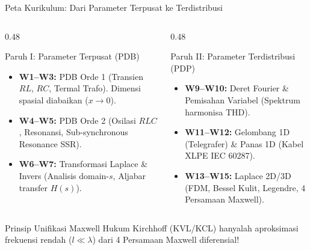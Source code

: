 \documentclass[aspectratio=169,10pt]{beamer}
\begin{document}
\begin{frame}{Peta Kurikulum: Dari Parameter Terpusat ke Terdistribusi}
  \begin{columns}[t]
    \begin{column}{0.48\textwidth}
      \begin{block}{Paruh I: Parameter Terpusat (PDB)}
        \small
        \begin{itemize}
          \item \textbf{W1--W3:} PDB Orde 1 (Transien $RL$, $RC$, Termal Trafo). Dimensi spasial diabaikan ($x \to 0$).
          \item \textbf{W4--W5:} PDB Orde 2 (Osilasi $RLC$, Resonansi, Sub-synchronous Resonance SSR).
          \item \textbf{W6--W7:} Transformasi Laplace \& Invers (Analisis domain-$s$, Aljabar transfer $H(s)$).
        \end{itemize}
      \end{block}
    \end{column}
    \begin{column}{0.48\textwidth}
      \begin{alertblock}{Paruh II: Parameter Terdistribusi (PDP)}
        \small
        \begin{itemize}
          \item \textbf{W9--W10:} Deret Fourier \& Pemisahan Variabel (Spektrum harmonisa THD).
          \item \textbf{W11--W12:} Gelombang 1D (Telegrafer) \& Panas 1D (Kabel XLPE IEC 60287).
          \item \textbf{W13--W15:} Laplace 2D/3D (FDM, Bessel Kulit, Legendre, 4 Persamaan Maxwell).
        \end{itemize}
      \end{alertblock}
    \end{column}
  \end{columns}
  \vspace{-0.05cm}
  \begin{exampleblock}{Prinsip Unifikasi Maxwell}
    \footnotesize
    Hukum Kirchhoff (KVL/KCL) hanyalah aproksimasi frekuensi rendah ($l \ll \lambda$) dari 4 Persamaan Maxwell diferensial!
  \end{exampleblock}
\end{frame}
\end{document}
